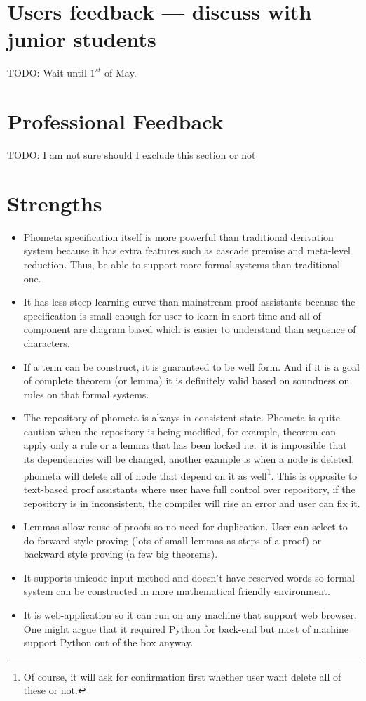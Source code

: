 \documentclass[master.tex]{subfiles}
\begin{document}
\section{Users feedback --- discuss with junior students}
TODO: Wait until $1^{st}$ of May.

\section{Professional Feedback}
TODO: I am not sure should I exclude this section or not

\section{Strengths}

\begin{itemize}
\item Phometa specification itself is more powerful than traditional derivation
  system because it has extra features such as cascade premise and meta-level
  reduction. Thus, be able to support more formal systems than traditional one.
\item It has less steep learning curve than mainstream proof assistants because
  the specification is small enough for user to learn in short time and all of
  component are diagram based which is easier to understand than sequence of
  characters.
\item If a term can be construct, it is guaranteed to be well form. And if it is
  a goal of complete theorem (or lemma) it is definitely valid based on
  soundness on rules on that formal systems.
\item The repository of phometa is always in consistent state. Phometa is quite
  caution when the repository is being modified, for example, theorem can apply
  only a rule or a lemma that has been locked i.e.\ it is impossible that its
  dependencies will be changed, another example is when a node is deleted,
  phometa will delete all of node that depend on it as well\footnote{Of course,
    it will ask for confirmation first whether user want delete all of these or
    not.}. This is opposite to text-based proof assistants where user have full
  control over repository, if the repository is in inconsistent, the compiler
  will rise an error and user can fix it.
\item Lemmas allow reuse of proofs so no need for duplication. User can select
  to do forward style proving (lots of small lemmas as steps of a proof) or
  backward style proving (a few big theorems).
\item It supports unicode input method and doesn't have reserved words so formal
  system can be constructed in more mathematical friendly environment.
\item It is web-application so it can run on any machine that support web
  browser. One might argue that it required Python for back-end but most of
  machine support Python out of the box anyway.
\end{itemize}
\end{document}
